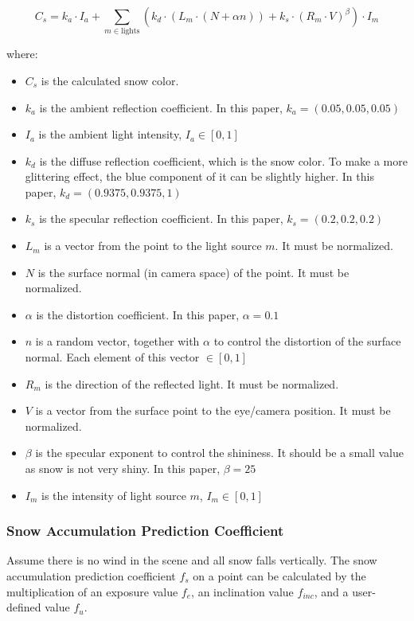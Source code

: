 \documentclass{article}
\begin{document}
\[
  C_{s} = k_a \cdot I_a + \sum_{m \in \text{lights}} (k_d \cdot (L_m \cdot (N + \alpha n)) + k_s \cdot (R_m \cdot V)^\beta) \cdot I_m  
\]

where:
\begin{itemize}
  \item \( C_{s} \) is the calculated snow color.
  \item \( k_a \) is the ambient reflection coefficient. In this paper, \( k_a = (0.05, 0.05, 0.05)\)
  \item \( I_a \) is the ambient light intensity, \( I_a \in [0, 1]\)
  \item \( k_d \) is the diffuse reflection coefficient, which is the snow color. To make a more glittering effect, %
  the blue component of it can be slightly higher. In this paper, \( k_d = (0.9375, 0.9375, 1)\)
  \item \( k_s \) is the specular reflection coefficient. In this paper, \( k_s = (0.2, 0.2, 0.2)\)
  \item \( L_m \) is a vector from the point to the light source \( m \). It must be normalized.
  \item \( N \) is the surface normal (in camera space) of the point. It must be normalized.
  \item \( \alpha \) is the distortion coefficient. In this paper, \( \alpha = 0.1\)
  \item \( n \) is a random vector, together with \( \alpha \) to control the distortion of the surface normal. Each 
  element of this vector \(\in [0, 1]\)
  \item \( R_m \) is the direction of the reflected light. It must be normalized.
  \item \( V \) is a vector from the surface point to the eye/camera position. It must be normalized.
  \item \( \beta \) is the specular exponent to control the shininess. It should be a small value as snow is not 
  very shiny. In this paper, \( \beta = 25\)
  \item \( I_m \) is the intensity of light source \( m \), \( I_m \in [0, 1]\)
\end{itemize}

\subsubsection {Snow Accumulation Prediction Coefficient}
Assume there is no wind in the scene and all snow falls vertically. The snow accumulation prediction coefficient 
\( f_{s} \) on a point can be calculated by the multiplication of an exposure value \( f_{e} \), an inclination 
value \( f_{inc} \), and a user-defined value \( f_{u} \).
\end{document}
